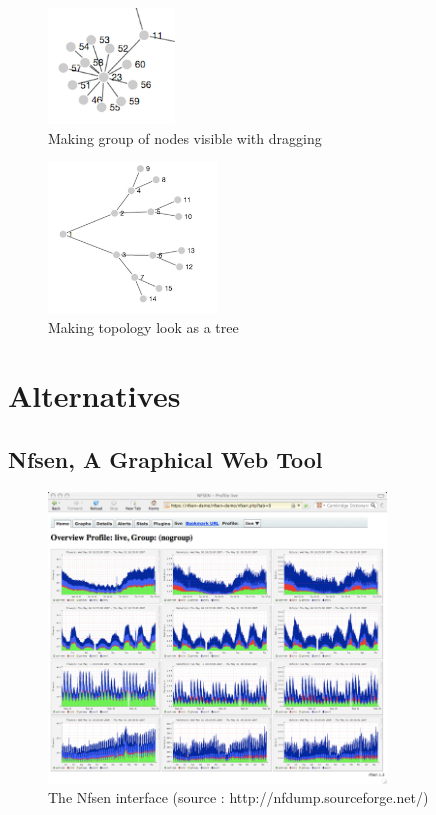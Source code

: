 \begin{figure}[!h]
	\centering
	\includegraphics[width=0.3\textwidth]{res/visible.png}
	\caption{Making group of nodes visible with dragging}
	\label{fig:visible}
\end{figure}

\begin{figure}[!h]
	\centering
	\includegraphics[width=0.4\textwidth]{res/dragtree.png}
	\caption{Making topology look as a tree}
	\label{fig:tree}
\end{figure}


\chapter{Alternatives}

\section{Nfsen, A Graphical Web Tool}
\begin{figure}[!h]
	\centering
	\includegraphics[width=0.8\textwidth]{res/nfsen.png}
	\caption{The Nfsen interface (source : http://nfdump.sourceforge.net/)}
	\label{fig:nfdump}
\end{figure}

